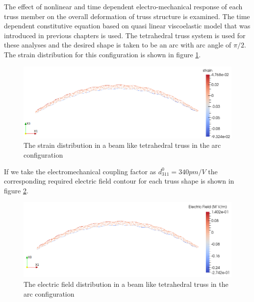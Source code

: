 The effect of nonlinear and time dependent electro-mechanical response of each truss member on the overall deformation of truss structure is examined.
The time dependent constitutive equation based on quasi linear viscoelastic model that was introduced in previous chapters is used.
The tetrahedral truss system is used for these analyses and the desired shape is taken to be an arc with arc angle of $\pi/2$.
The strain distribution for this configuration is shown in figure \ref{fig:linear_tetrahedral_bending_strain_contour}.
\begin{figure} 
\centering
\includegraphics[width=6.0in]{./chap_5_active_trusses/images_non_linear_time_dependent_constitutive_equatio/linear_tetrahedral_bending_strain_contour.png}
\caption{The strain distribution in a beam like tetrahedral truss in the arc configuration}
\label{fig:linear_tetrahedral_bending_strain_contour}
\end{figure} 
If we take the electromechanical coupling factor as $d_{311}^0=340pm/V$ the corresponding required electric field contour for each truss shape is shown in figure \ref{fig:linear_tetrahedral_bending_efield_contour}.

\begin{figure} 
\centering
\includegraphics[width=6.0in]{./chap_5_active_trusses/images_non_linear_time_dependent_constitutive_equatio/linear_tetrahedral_bending_electric_field_contour.png}
\caption{The electric field distribution in a beam like tetrahedral truss in the arc configuration}
\label{fig:linear_tetrahedral_bending_efield_contour}
\end{figure} 


